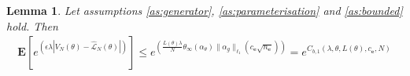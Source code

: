 \documentclass{article}
\def\rve{{\mathbf{e}}}
\def\rvy{{\mathbf{y}}}
\newtheorem{lemma}[theorem]{Lemma}
\newtheorem{assumption}[theorem]{Assumption}
\newcommand{\bE}{\mathbf{E}}
\begin{document}
\begin{lemma}\label{lemma:bounded_mgf(V-hatL)}Let assumptions \ref{as:generator}, \ref{as:parameterisation} and \ref{as:bounded} hold. Then
    \begin{align*}
        \bE[e^{\left(\epsilon \lambda|V_N(\theta)-\hat{\mathcal{L}}_N(\theta)|\right)}] 
        \leq e^{\left(\frac{L(\theta)\lambda}{N} \theta_{\infty}(\alpha_{\theta})\|\alpha_g\|_{\ell_1} (c_\rve\sqrt{n_\rve})\right)}
        =e^{C_{b,1}(\lambda,\theta,L(\theta),c_\rve,N)}
    \end{align*}
\end{lemma}
\end{document}
